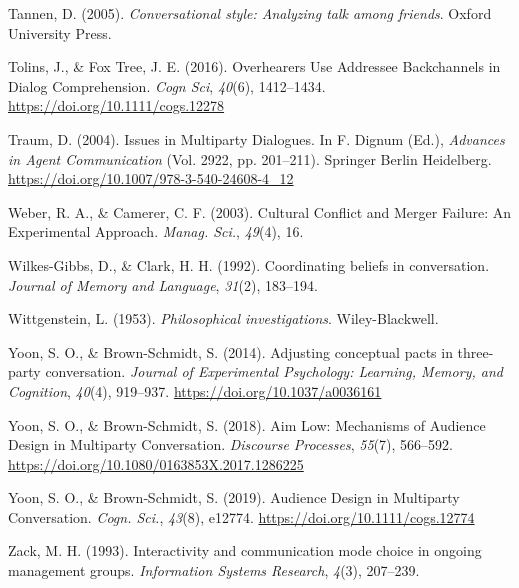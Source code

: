 \documentclass[
  english,
]{article}
\newlength{\cslhangindent}
\newenvironment{CSLReferences}[2] %
{\begin{list}{}{%
			\setlength{\itemindent}{0pt}
			\setlength{\leftmargin}{0pt}
			\setlength{\parsep}{0pt}
			\ifodd #1
			\setlength{\leftmargin}{\cslhangindent}
			\setlength{\itemindent}{-1\cslhangindent}
			\fi
			\setlength{\itemsep}{#2\baselineskip}}}
	{\end{list}}
\begin{document}
\begin{CSLReferences}{1}{0}
Tannen, D. (2005). \emph{Conversational style: Analyzing talk among friends}. Oxford University Press.

Tolins, J., \& Fox Tree, J. E. (2016). Overhearers {Use Addressee Backchannels} in {Dialog Comprehension}. \emph{Cogn Sci}, \emph{40}(6), 1412--1434. \url{https://doi.org/10.1111/cogs.12278}

Traum, D. (2004). Issues in {Multiparty Dialogues}. In F. Dignum (Ed.), \emph{Advances in {Agent Communication}} (Vol. 2922, pp. 201--211). {Springer Berlin Heidelberg}. \url{https://doi.org/10.1007/978-3-540-24608-4_12}

Weber, R. A., \& Camerer, C. F. (2003). Cultural {Conﬂict} and {Merger Failure}: {An Experimental Approach}. \emph{Manag. Sci.}, \emph{49}(4), 16.

Wilkes-Gibbs, D., \& Clark, H. H. (1992). Coordinating beliefs in conversation. \emph{Journal of Memory and Language}, \emph{31}(2), 183--194.

Wittgenstein, L. (1953). \emph{Philosophical investigations}. Wiley-Blackwell.

Yoon, S. O., \& Brown-Schmidt, S. (2014). Adjusting conceptual pacts in three-party conversation. \emph{Journal of Experimental Psychology: Learning, Memory, and Cognition}, \emph{40}(4), 919--937. \url{https://doi.org/10.1037/a0036161}

Yoon, S. O., \& Brown-Schmidt, S. (2018). Aim {Low}: {Mechanisms} of {Audience Design} in {Multiparty Conversation}. \emph{Discourse Processes}, \emph{55}(7), 566--592. \url{https://doi.org/10.1080/0163853X.2017.1286225}

Yoon, S. O., \& Brown‐Schmidt, S. (2019). Audience {Design} in {Multiparty Conversation}. \emph{Cogn. Sci.}, \emph{43}(8), e12774. \url{https://doi.org/10.1111/cogs.12774}

Zack, M. H. (1993). Interactivity and communication mode choice in ongoing management groups. \emph{Information Systems Research}, \emph{4}(3), 207--239.

\end{CSLReferences}
\end{document}

